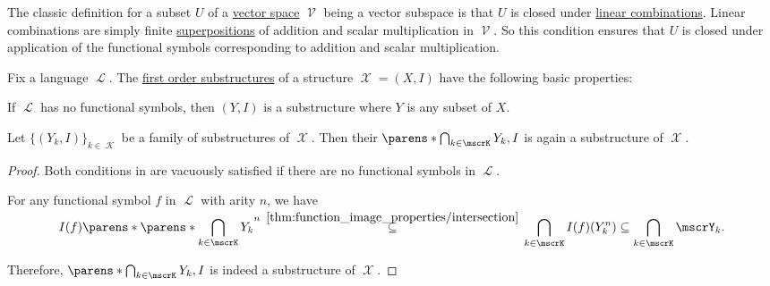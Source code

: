 \begin{example}\label{ex:def:first_order_substructure/vector_space}
  The classic definition for a subset \( U \) of a \hyperref[def:vector_space]{vector space} \( \mscrV \) being a vector subspace is that \( U \) is closed under \hyperref[def:linear_combination]{linear combinations}. Linear combinations are simply finite \hyperref[def:multi_valued_function/superposition]{superpositions} of addition and scalar multiplication in \( \mscrV \). So this condition ensures that \( U \) is closed under application of the functional symbols corresponding to addition and scalar multiplication.
\end{example}

\begin{proposition}\label{thm:first_order_substructure_properties}
  Fix a language \( \mscrL \). The \hyperref[def:first_order_substructure]{first order substructures} of a structure \( \mscrX = (X, I) \) have the following basic properties:
  \begin{thmenum}
     If \( \mscrL \) has no functional symbols, then \( (Y, I) \) is a substructure where \( Y \) is any subset of \( X \).

     Let \( \{ (Y_k, I) \}_{k \in \mscrK} \) be a family of substructures of \( \mscrX \). Then their  \( \parens*{\bigcap_{k \in \mscrK} Y_k, I} \) is again a substructure of \( \mscrX \).
  \end{thmenum}
\end{proposition}
\begin{proof}
   Both conditions in  are vacuously satisfied if there are no functional symbols in \( \mscrL \).

   For any functional symbol \( f \) in \( \mscrL \) with arity \( n \), we have
  \begin{equation*}
    I(f)\parens*{\parens*{\bigcap_{\smash{k \in \mscrK}} Y_k}^n}
    \reloset {\ref{thm:function_image_properties/intersection}} \subseteq
    \bigcap_{k \in \mscrK} I(f)(Y_k^n) \subseteq \bigcap_{k \in \mscrK} \mscrY_k.
  \end{equation*}

  Therefore, \( \parens*{\bigcap_{k \in \mscrK} Y_k, I} \) is indeed a substructure of \( \mscrX \).
\end{proof}

